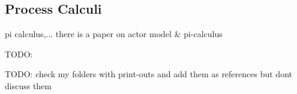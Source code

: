 \subsection{Process Calculi}
pi calculus,...
there is a paper on actor model \& pi-calculus

TODO: \cite{padget_-calculus_1998}

TODO: check my folders with print-outs and add them as references but dont discuss them